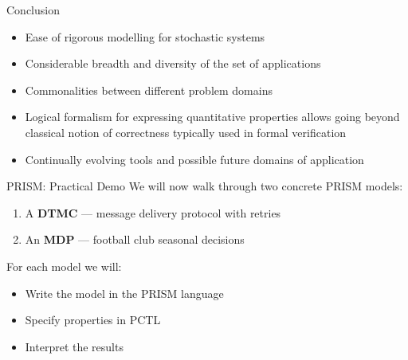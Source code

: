 \documentclass[dvipsnames]{beamer}
\begin{document}

\begin{frame}{Conclusion}

    \begin{itemize}
        \item   Ease of rigorous modelling for stochastic systems
        \item   Considerable breadth and diversity of the set of applications
        \item   Commonalities between different problem domains
        \item  Logical formalism for expressing quantitative properties allows going
              beyond classical notion of correctness typically used in formal verification
        \item  Continually evolving tools and possible future domains of application
    \end{itemize}


\end{frame}




\begin{frame}{PRISM: Practical Demo}
    We will now walk through two concrete PRISM models:
    \begin{enumerate}
        \item A \textbf{DTMC} — message delivery protocol with retries
        \item An \textbf{MDP} — football club seasonal decisions
    \end{enumerate}
    \vspace{1em}
    For each model we will:
    \begin{itemize}
        \item Write the model in the PRISM language
        \item Specify properties in PCTL
        \item Interpret the results
    \end{itemize}
\end{frame}
\end{document}
